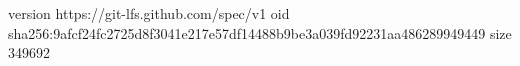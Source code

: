 version https://git-lfs.github.com/spec/v1
oid sha256:9afcf24fc2725d8f3041e217e57df14488b9be3a039fd92231aa486289949449
size 349692
